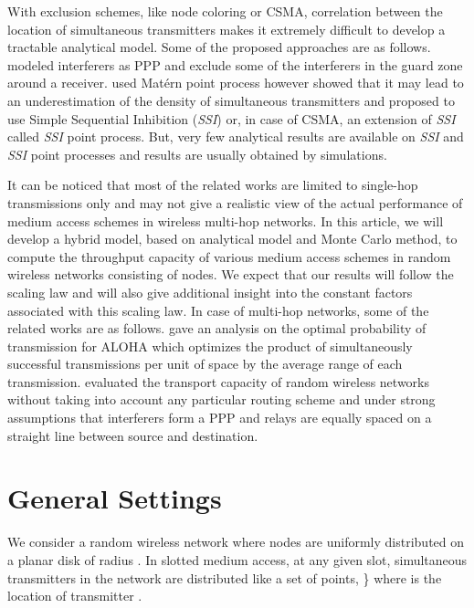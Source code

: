 \documentclass[12pt,english]{article}
\begin{document}
With exclusion schemes, like node coloring or CSMA, correlation between the location of simultaneous transmitters makes it extremely difficult to develop a tractable analytical model. Some of the proposed approaches are as follows. \cite{Guard,Guard2} modeled interferers as PPP and exclude some of the interferers in the guard zone around a receiver. \cite{CSMA-Model,Weber3} used Mat\'ern point process however \cite{Busson} showed that it may lead to an underestimation of the density of simultaneous transmitters and proposed to use Simple Sequential Inhibition ({\em SSI}) or, in case of CSMA, an extension of {\em SSI} called {\em SSI} point process. But, very few analytical results are available on {\em SSI} and {\em SSI} point processes and results are usually obtained by simulations.  

It can be noticed that most of the related works are limited to single-hop transmissions only and may not give a realistic view of the actual performance of medium access schemes in wireless multi-hop networks. In this article, we will develop a hybrid model, based on analytical model and Monte Carlo method, to compute the throughput capacity of various medium access schemes in random wireless networks consisting of  nodes. We expect that our results will follow the  scaling law and will also give additional insight into the constant factors associated with this scaling law. In case of multi-hop networks, some of the related works are as follows. \cite{SR-ALOHA} gave an analysis on the optimal probability of transmission for ALOHA which optimizes the product of simultaneously successful transmissions per unit of space by the average range of each transmission. \cite{Weber4} evaluated the transport capacity of random wireless networks without taking into account any particular routing scheme and under strong assumptions that interferers form a PPP and relays are equally spaced on a straight line between source and destination. 

\section{General Settings}
\label{sec:model}

We consider a random wireless network where  nodes are uniformly distributed on a planar disk of radius . In slotted medium access, at any given slot, simultaneous transmitters in the network are distributed like a set of points, \} where  is the location of transmitter . 
\end{document}
